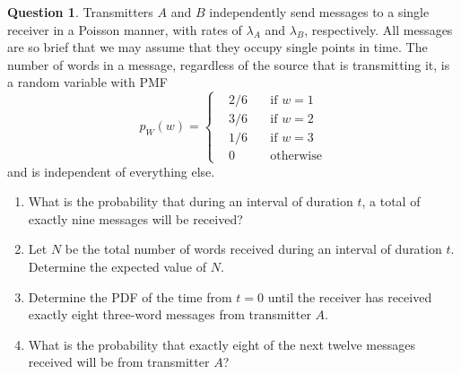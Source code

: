 \documentclass[utf8]{article}
\theoremstyle{definition}%
\newtheorem{question}{Question} %
\theoremstyle{plain}%
\begin{document}
\begin{question}
    Transmitters $A$ and $B$ independently send messages to a single receiver in a Poisson manner, with rates of $\lambda_A$ and $\lambda_B$, respectively. All messages are so brief that we may assume that they occupy single points in time. The number of words in a message, regardless of the source that is transmitting it, is a random variable with PMF
    \begin{equation}
        p_W(w) = \left\{\begin{aligned}
            &2/6 \quad& \text{if } w = 1 \\ 
            &3/6 \quad& \text{if } w = 2 \\
            &1/6 \quad& \text{if } w = 3 \\
            &0 \quad& \text{otherwise}
        \end{aligned}\right.
    \end{equation}
    and is independent of everything else.
    \begin{enumerate}[label=(\alph*)]
        \item What is the probability that during an interval of duration $t$, a total of exactly nine messages will be received?
        \item Let $N$ be the total number of words received during an interval of duration $t$. Determine the expected value of $N$.
        \item Determine the PDF of the time from $t = 0$ until the receiver has received exactly eight three-word messages from transmitter $A$.
        \item What is the probability that exactly eight of the next twelve messages received will be from transmitter $A$?
    \end{enumerate}
\end{question}
\end{document}
